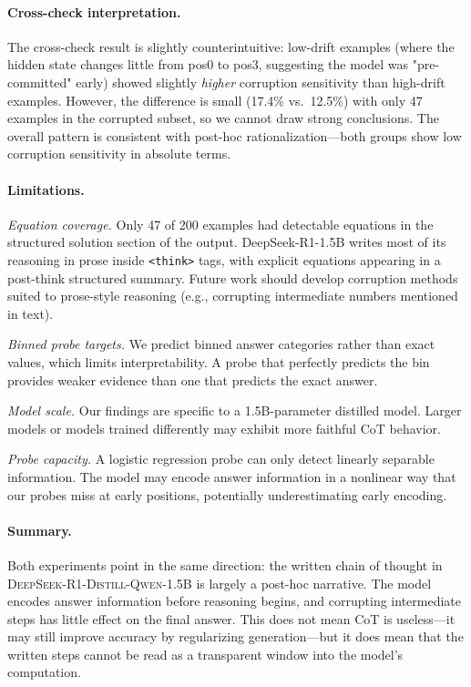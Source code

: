 \documentclass[11pt]{article}
\begin{document}
\paragraph{Cross-check interpretation.}
The cross-check result is slightly counterintuitive: low-drift examples (where the hidden state changes little from pos0 to pos3, suggesting the model was "pre-committed" early) showed slightly \textit{higher} corruption sensitivity than high-drift examples. However, the difference is small (17.4\% vs.\ 12.5\%) with only 47 examples in the corrupted subset, so we cannot draw strong conclusions. The overall pattern is consistent with post-hoc rationalization—both groups show low corruption sensitivity in absolute terms.

\paragraph{Limitations.}
\textit{Equation coverage.} Only 47 of 200 examples had detectable equations in the structured solution section of the output. DeepSeek-R1-1.5B writes most of its reasoning in prose inside \texttt{<think>} tags, with explicit equations appearing in a post-think structured summary. Future work should develop corruption methods suited to prose-style reasoning (e.g., corrupting intermediate numbers mentioned in text).

\textit{Binned probe targets.} We predict binned answer categories rather than exact values, which limits interpretability. A probe that perfectly predicts the bin provides weaker evidence than one that predicts the exact answer.

\textit{Model scale.} Our findings are specific to a 1.5B-parameter distilled model. Larger models or models trained differently may exhibit more faithful CoT behavior.

\textit{Probe capacity.} A logistic regression probe can only detect linearly separable information. The model may encode answer information in a nonlinear way that our probes miss at early positions, potentially underestimating early encoding.

\paragraph{Summary.}
Both experiments point in the same direction: the written chain of thought in \textsc{DeepSeek-R1-Distill-Qwen-1.5B} is largely a post-hoc narrative. The model encodes answer information before reasoning begins, and corrupting intermediate steps has little effect on the final answer. This does not mean CoT is useless—it may still improve accuracy by regularizing generation—but it does mean that the written steps cannot be read as a transparent window into the model's computation.
\end{document}
